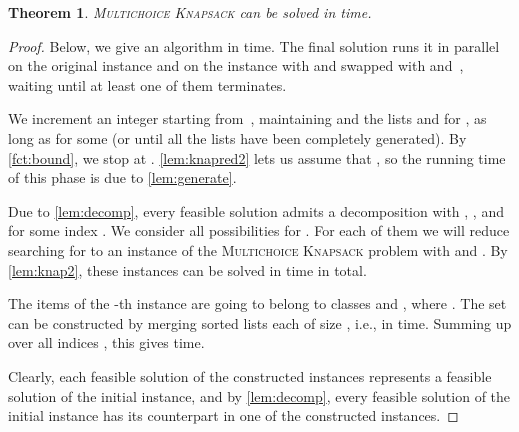 \documentclass{article}
\theoremstyle{plain}
\newtheorem{theorem}{Theorem}[section]
\theoremstyle{definition}
\newcommand{\MK}{\textsc{Multichoice Knapsack}\xspace}
\begin{document}
  \begin{theorem}\label{thm:knap}
    \MK can be solved in  time.
  \end{theorem}
  \begin{proof}
  Below, we give an algorithm in  time. 
  The final solution runs it in parallel on the original instance and on the instance with  and  swapped with  and~,
   waiting until at least one of them terminates.
    
    We increment an integer  starting from~, maintaining  and the lists  and  for , as long as  for some  (or until all the lists have been completely generated).
    By \cref{fct:bound}, we stop at .
    \cref{lem:knapred2} lets us assume that , so  
    the running time of this phase is  due to \cref{lem:generate}.
    
    
    Due to \cref{lem:decomp}, every feasible solution  admits a decomposition 
    with , , and  for some index . 
    We consider all possibilities for . For each of them we will reduce searching for  to an instance of the \MK
    problem with  and . By \cref{lem:knap2}, these instances can be solved in   time in total.
   
    The items of the -th instance are going to belong to classes  and ,
    where .
    The set  can be constructed by merging  sorted lists each of size ,
    i.e., in  time.
    Summing up over all indices , this gives  time.
       
    Clearly, each feasible solution of the constructed instances represents a feasible solution of the initial instance,
    and by \cref{lem:decomp}, every feasible solution of the initial instance has its counterpart in one of the constructed instances. 
  \end{proof}
 
\end{document}
